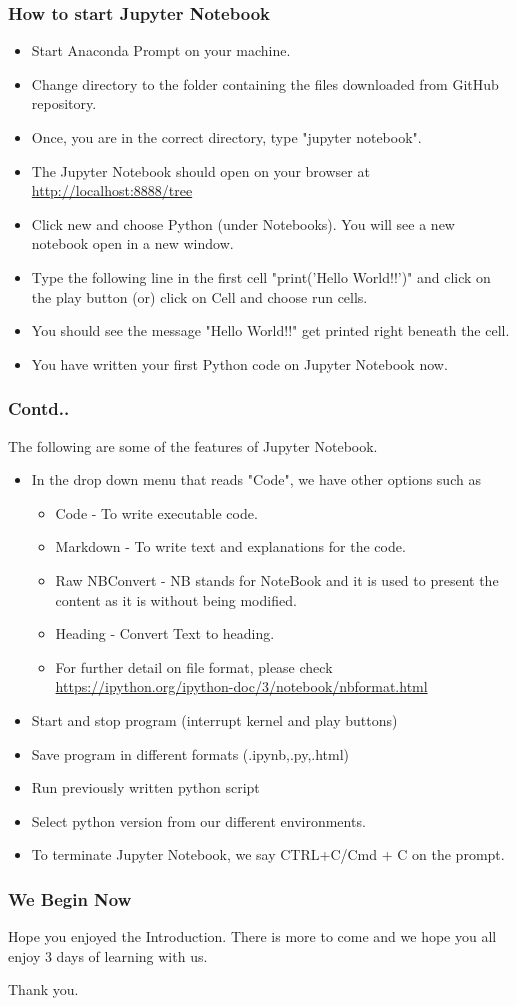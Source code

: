 \documentclass{beamer}
\begin{document}
\begin{frame}
\frametitle{How to start Jupyter Notebook}
\begin{itemize}
\item Start Anaconda Prompt on your machine.
\item Change directory to the folder containing the files downloaded from GitHub repository.
\item Once, you are in the correct directory, type  "jupyter notebook".
\item The Jupyter Notebook should open on your browser at \url{http://localhost:8888/tree}
\item Click new and choose Python (under Notebooks). You will see a new notebook open in a new window.
\item Type the following line in the first cell "print('Hello World!!')" and click on the play button (or) click on Cell and choose run cells.
\item You should see the message "Hello World!!" get printed right beneath the cell.
\item You have written your first Python code on Jupyter Notebook now.
\end{itemize}
\end{frame}

\begin{frame}
\frametitle{Contd..}
The following are some of the features of Jupyter Notebook.
\begin{itemize}
\item In the drop down menu that reads "Code", we have other options such as 
\begin{itemize}
\item Code - To write executable code.
\item Markdown - To write text and explanations for the code.
\item Raw NBConvert - NB stands for NoteBook and it is used to present the content as it is without being modified.
\item Heading -  Convert Text to heading.
\item For further detail on file format, please check \url{https://ipython.org/ipython-doc/3/notebook/nbformat.html} 
\end{itemize}
\item Start and stop program (interrupt kernel and play buttons)
\item Save program in different formats (.ipynb,.py,.html)
\item Run previously written python script
\item Select python version from our different environments.
\item To terminate Jupyter Notebook, we say CTRL+C/Cmd + C on the prompt.
\end{itemize}
\end{frame}
\begin{frame}
\frametitle{We Begin Now}
\centering
Hope you enjoyed the Introduction. There is more to come and we hope you all enjoy 3 days of learning with us.


Thank you. 
\end{frame}
\end{document}
